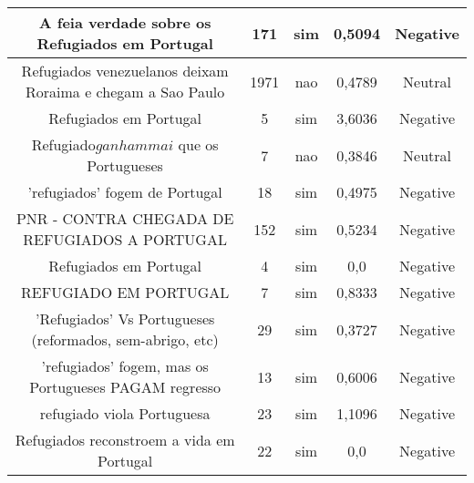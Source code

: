\documentclass[11pt]{article}
\newlength\mylength
\begin{document}
\begin{center}
\begin{longtable}{||C{.40\mylength}||C{.20\mylength}||C{.20\mylength}||C{.30\mylength}||C{.20\mylength}||}
   A feia verdade sobre os Refugiados em Portugal  & 171 & sim & 0,5094 & Negative \\  \hline
   Refugiados venezuelanos deixam Roraima e chegam a Sao Paulo  & 1971 & nao & 0,4789 & Neutral \\  \hline
   Refugiados em Portugal  & 5 & sim & 3,6036 & Negative \\  \hline
   Refugiado$ ganham mai$ que os Portugueses  & 7 & nao & 0,3846 & Neutral \\  \hline
   'refugiados' fogem de Portugal  & 18 & sim & 0,4975 & Negative \\  \hline
   PNR - CONTRA CHEGADA DE REFUGIADOS A PORTUGAL  & 152 & sim & 0,5234 & Negative \\  \hline
  Refugiados em Portugal & 4 & sim & 0,0 & Negative \\  \hline
   REFUGIADO EM PORTUGAL  & 7 & sim & 0,8333 & Negative \\  \hline
   'Refugiados' Vs Portugueses (reformados, sem-abrigo, etc)  & 29 & sim & 0,3727 & Negative \\  \hline
   'refugiados' fogem, mas os Portugueses PAGAM regresso  & 13 & sim & 0,6006 & Negative \\  \hline
   refugiado viola Portuguesa  & 23 & sim & 1,1096 & Negative \\  \hline
   Refugiados reconstroem a vida em Portugal  & 22 & sim & 0,0 & Negative \\  \hline

\end{longtable}
\end{center}
\end{document}
